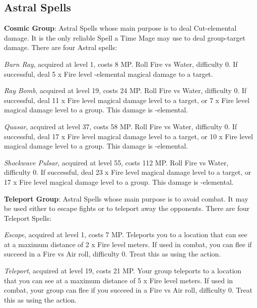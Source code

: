 \begin{multicols}{2}
    
    \subsection{Astral Spells}\label{subsec:time-astral}

    \textbf{Cosmic Group}: Astral Spells whose main purpose is to deal Cut-elemental damage. It is the only reliable Spell a Time Mage may use to deal group-target damage. There are four Astral spells:
    
    \textit{Burn Ray}, acquired at level 1, costs 8 MP\@. Roll Fire vs Water, difficulty 0. If successful, deal 5 x Fire level -elemental magical damage to a target.
    
    \textit{Ray Bomb}, acquired at level 19, costs 24 MP\@. Roll Fire vs Water, difficulty 0. If successful, deal 11 x Fire level magical damage level to a target, or 7 x Fire level magical damage level to a group. This damage is -elemental.
    
    \textit{Quasar}, acquired at level 37, costs 58 MP\@. Roll Fire vs Water, difficulty 0. If successful, deal 17 x Fire level magical damage level to a target, or 10 x Fire level magical damage level to a group. This damage is -elemental.
    
    \textit{Shockwave Pulsar}, acquired at level 55, costs 112 MP\@. Roll Fire vs Water, difficulty 0. If successful, deal 23 x Fire level magical damage level to a target, or 17 x Fire level magical damage level to a group. This damage is -elemental.
    
    \ffcrystal[type=level,height=8pt]

    \textbf{Teleport Group}: Astral Spells whose main purpose is to avoid combat. It may be used either to escape fights or to teleport away the opponents. There are four Teleport Spells:
	
    \textit{Escape}, acquired at level 1, costs 7 MP\@. Teleports you to a location that can see at a maximum distance of 2 x Fire level meters. If used in combat, you can flee if succeed in a Fire vs Air roll, difficulty 0. Treat this as using the  action.
    
    \textit{Teleport}, acquired at level 19, costs 21 MP\@. Your group teleports to a location that you can see at a maximum distance of 5 x Fire level meters. If used in combat, your group can flee if you succeed in a Fire vs Air roll, difficulty 0. Treat this as using the  action.
    

\end{multicols}

